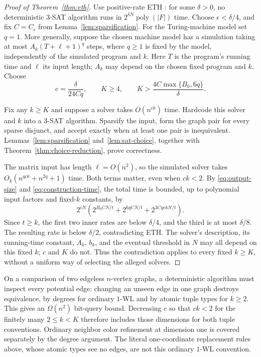 \begin{proof}[Proof of Theorem~\ref{thm:eth}]
Use positive-rate ETH \citep{IP2001}: for some \(\delta>0\), no
deterministic \(3\)-SAT algorithm runs in
\(2^{\delta N}\operatorname{poly}(|F|)\) time.
Choose \(\epsilon<\delta/4\), and fix \(C=C_\epsilon\) from
Lemma~\ref{lem:sparsification}.
For the Turing-machine model set \(q=1\). More generally, suppose the
chosen machine model has a simulation taking at most
\(A_k(T+\ell+1)^q\) steps, where \(q\ge1\) is fixed by the model,
independently of the simulated program and \(k\).
Here \(T\) is the program's running time and \(\ell\) its input length;
\(A_k\) may depend on the chosen fixed program and \(k\). Choose
\[
c=\frac{\delta}{24Cq},
\qquad
K\ge4,\qquad
K>\frac{4C\max\{B_0,6q\}}{\delta}.
\]

Fix any \(k\ge K\) and suppose a solver takes \(O(n^{ck})\) time.
Hardcode this solver and \(k\) into a \(3\)-SAT algorithm.
Sparsify the input, form the graph pair for every sparse disjunct, and
accept exactly when at least one pair is inequivalent.
Lemmas~\ref{lem:sparsification} and~\ref{lem:sat-choice}, together with
Theorem~\ref{thm:choice-reduction}, prove correctness.

The matrix input has length \(\ell=O(n^2)\), so the simulated solver
takes \(O_k(n^{qck}+n^{2q}+1)\) time. Both terms matter, even when
\(ck<2\). By \eqref{eq:output-size} and \eqref{eq:construction-time},
the total time is bounded, up to polynomial input factors and
fixed-\(k\) constants, by
\[
2^{\epsilon N}
\left(
  2^{B_0 CN/t}
 +2^{6qCN/t}
 +2^{3CqckN/t}
\right).
\]
Since \(t\ge k\), the first two inner rates are below \(\delta/4\),
and the third is at most \(\delta/8\).
The resulting rate is below \(\delta/2\), contradicting ETH.
The solver's description, its running-time constant, \(A_k\), \(b_k\),
and the eventual threshold in \(N\) may all depend on this fixed \(k\);
\(c\) and \(K\) do not. Thus the contradiction applies to every fixed
\(k\ge K\), without a uniform way of selecting the alleged solvers.
\end{proof}

\begin{remark}
On a comparison of two edgeless \(n\)-vertex graphs, a deterministic algorithm must
inspect every potential edge: changing an unseen edge in one graph
destroys equivalence, by degrees for ordinary \(1\)-WL and by atomic
tuple types for \(k\ge2\). This gives an \(\Omega(n^2)\) bit-query bound.
Decreasing \(c\) so that \(ck<2\) for the finitely many
\(2\le k<K\) therefore includes those dimensions for both tuple
conventions. Ordinary neighbor color refinement at dimension one is
covered separately by the degree argument. The literal one-coordinate
replacement rules above, whose atomic types see no edges, are not this
ordinary \(1\)-WL convention.
\end{remark}


